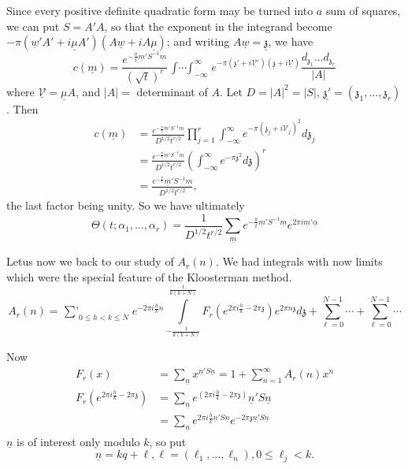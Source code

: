 Since every positive definite quadratic form may be turned into $a$
sum of squares, we can put $S=A'A$, so that the exponent in the
integrand become $- \pi (\underline{w}' A' + i\underline{\mu} A')(A
\underline{w}+ i A \underline{\mu})$; and writing $A \underline{w}=
\underline{\mathfrak{z}}$, we have
$$
c (\underline{m}) = \frac{e^{-\frac{\pi}{t} \underline{m}' S^{-1}
    \underline{m}}}{(\sqrt{t})^r} \mathop{\int\cdots \int}_{-
  \infty}^\infty e^{- \pi (\underline{\mathfrak{z}'}+ i
  \underline{\mathscr{V}'})  (\underline{\mathfrak{z}}+ i
  \underline{\mathscr{V}})} \frac{d_{\mathfrak{z}_1}\ldots d_{\mathfrak{z}_r}}{|A|} 
$$
where $\underline{\mathscr{V}}= \underline{\mu} A$, and $|A|=$
determinant of $A$. Let $D= |A|^2 = |S|$, $\underline{\mathfrak{z}'}=
(\mathfrak{z}_1,\ldots , \mathfrak{z}_r)$. Then
\begin{align*}
  c(\underline{m}) & = \frac{e^{-\frac{\pi}{t} \underline{m}' S^{-1}
      \underline{m}}}{D^{1/2} t^{r/2}} \prod^r_{j=1} \int^\infty_{-
    \infty} e^{- \pi (\mathfrak{z}_j + i \mathscr{V}_j)^2} d
  \mathfrak{z}_j\\
  & = \frac{e^{- \frac{\pi}{t} \underline{m}' S^{-1}
      \underline{m}}}{D^{1/2}t^{r/2}} \left(\int^\infty_{- \infty}
  e^{- \pi \mathfrak{z}^2} d \mathfrak{z} \right)^r\\
  & = \frac{e^{- \frac{\pi}{t}} \underline{m}' S^{-1}
    \underline{m}}{D^{1/2} t^{r/2}},
\end{align*}
the last factor being unity. So we have ultimately
$$
\Theta (t; \alpha_1, \ldots , \alpha_r) = \frac{1}{D^{1/2} t^{r/2}}
\sum_{\underline{m}} e^{- \frac{\pi}{t} \underline{m}' S^{-1}
  \underline{m}} e^{2 \pi i \underline{m}' \underline{\alpha} }
$$

Let\pageoriginale us now we back to our study of $A_r(n)$. We had integrals with
now limits which were the special feature of the Kloosterman method.
$$
A_r (n) = \mathop{\textstyle{\sum'}}_{0 \leq h < k \leq N} e^{-2 \pi i
\frac{h}{k}n} \int\limits^{\frac{1}{k(k+N)}}_{-\frac{1}{k(k+N)}} F_r
\left(e^{2 \pi i \frac{h}{k} - 2 \pi \mathfrak{z}} \right) e^{2 \pi n \mathfrak{z}} d
\mathfrak{z}+ \sum^{N-1}_{\ell =0} \cdots + \sum^{N-1}_{\ell=0} \cdots  
$$

Now 
\begin{align*}
  F_r (x) & = \sum_{\underline{n}} x^{\underline{n}' S\underline{n}}=
  1+ \sum^\infty_{n=1} A_r (n) x^n\\
  F_r \left(e^{2 \pi i \frac{h}{k} - 2 \pi \mathfrak{z}} \right) & =
  \sum_{\underline{n}} e^{(2 \pi i \frac{h}{k} - 2 \pi \mathfrak{z})}
  \underline{n}' S \underline{n}\\
  & = \sum_{\underline{n}} e^{2 \pi i \frac{h}{k} \underline{n}' S
    \underline{n}} e^{- 2 \pi \mathfrak{z} \underline{n}' S \underline{n}}
\end{align*}
$\underline{n}$ is of interest only modulo $k$, so put
$$
\underline{n} = k q + \ell, \ell = (\ell_1, \ldots , \ell_n), 0 \leq
\ell_j < k.
$$

